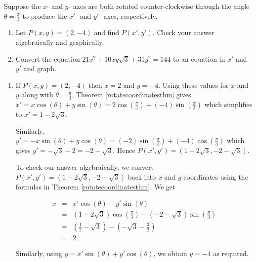 \documentclass{ximera}
\begin{document}
\begin{example} \label{rotatedaxesex1}  Suppose the $x$- and $y$- axes are both rotated counter-clockwise through the angle $\theta = \frac{\pi}{3}$ to produce the $x'$- and $y'$- axes, respectively. 


\begin{enumerate}

\item  Let $P(x,y) = (2,-4)$ and find $P(x',y')$.  Check your answer algebraically and graphically.

\item  \label{rotatedellipseex} Convert the equation $21x^2+10xy\sqrt{3}+31y^2=144$ to an equation in $x'$ and $y'$ and graph.

\end{enumerate}

\begin{explanation}

\begin{enumerate}

 \item  If $P(x,y) = (2,-4)$ then $x=2$ and $y=-4$.  Using these values for $x$ and $y$ along with  $\theta = \frac{\pi}{3}$, Theorem \ref{rotatecoordinatesthm} gives
$x' = x \cos(\theta) + y \sin(\theta) = 2 \cos\left(\frac{\pi}{3}\right) + (-4)\sin\left(\frac{\pi}{3}\right)$ which simplifies to $x' = 1-2\sqrt{3}$.  

Similarly,  $y' = -x\sin(\theta) + y\cos(\theta) = (-2)\sin\left(\frac{\pi}{3}\right) + (-4)\cos\left(\frac{\pi}{3}\right)$ which gives $y' = -\sqrt{3}-2 = -2-\sqrt{3}$. Hence $P(x',y') = \left(1-2\sqrt{3}, -2-\sqrt{3}\right)$.  

To check our answer algebraically,  we convert $P(x',y') = \left(1-2\sqrt{3},-2-\sqrt{3}\right)$ back into $x$ and $y$ coordinates using the formulas in   Theorem \ref{rotatecoordinatesthm}.  We get

\[ \begin{array}{rcl}
x  & = &  x' \cos(\theta) - y' \sin(\theta) \\  
   & = & (1-2\sqrt{3}) \cos\left(\frac{\pi}{3}\right) - (-2-\sqrt{3})\sin\left(\frac{\pi}{3}\right) \\  
   & = & \left(\frac{1}{2} - \sqrt{3} \right) -\left(-\sqrt{3} - \frac{3}{2}\right)\\  
   & = & 2 \end{array} \] 
   
Similarly, using  $y =  x'\sin(\theta) + y'\cos(\theta)$, we obtain $y = -4$ as required.  


\end{enumerate}
\end{explanation}
\end{example}
\end{document}
